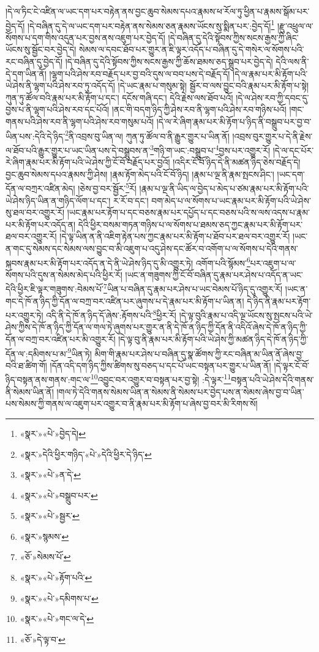 །དེ་ལ་ཏིང་ངེ་འཛིན་ལ་ཡང་དག་པར་བརྟེན་ནས་བྱང་ཆུབ་སེམས་དཔའ་རྣམས་ཕ་རོལ་ཏུ་ཕྱིན་པ་རྣམས་སྒོམ་པར་བྱེད་དོ། །དེ་བཞིན་དུ་དེ་ལ་ཡང་དག་པར་བརྟེན་ནས་སེམས་ཅན་རྣམས་ཡོངས་སུ་སྨིན་པར་:བྱེད་དོ།\footnote{«སྣར་»«པེ་»བྱེད་དེ།} །རྫུ་འཕྲུལ་ལ་སོགས་པ་དག་གིས་འདུན་པར་བྱས་ནས་འཇུག་པར་བྱེད་དོ། །དེ་བཞིན་དུ་དེའི་སྟོབས་ཀྱིས་སངས་རྒྱས་ཀྱི་ཞིང་ཡོངས་སུ་སྦྱོང་བར་བྱེད་དེ། སེམས་ལ་དབང་ཐོབ་པར་གྱུར་ན་ཇི་ལྟར་འདོད་པ་བཞིན་དུ་དེ་གསེར་ལ་སོགས་པའི་རང་བཞིན་དུ་བྱེད་དོ། །དེ་བཞིན་དུ་དེའི་སྟོབས་ཀྱིས་སངས་རྒྱས་ཀྱི་ཆོས་ཐམས་ཅད་སྒྲུབ་པར་བྱེད་དེ། དེའི་ལས་ནི་དེ་དག་ཡིན་ནོ། །ལྷག་པའི་ཤེས་རབ་བརྗོད་པར་བྱ་བའི་དུས་ལ་བབ་པས་དེ་བརྗོད་དོ། །དེ་ལ་རྣམ་པར་མི་རྟོག་པའི་ཡེ་ཤེས་ནི་ལྷག་པའི་ཤེས་རབ་ཏུ་འདོད་དོ། །དེ་ཡང་རྣམ་པ་གསུམ་སྟེ། སྦྱོར་བ་ལས་བྱུང་བའི་རྣམ་པར་མི་རྟོག་པ་སྟེ། ཀུན་ཏུ་ཚོལ་བའི་རྣམ་པར་མི་རྟོག་པ་དང་། དངོས་གཞི་དང་། དེའི་རྗེས་ལས་ཐོབ་པའོ། །དེ་ལ་ཤེས་རབ་ཀྱི་དབང་དུ་བྱས་པ་ནི་ལྷག་པའི་ཤེས་རབ་དང་པོའོ། །ནང་གི་བདག་ཉིད་ཀྱི་ཤེས་རབ་ནི་ལྷག་པའི་ཤེས་རབ་གཉིས་པའོ། །གང་གནས་པའི་ཤེས་རབ་ནི་ལྷག་པའི་ཤེས་རབ་གསུམ་པའོ། །དེ་ལ་རེ་ཞིག་རྣམ་པར་མི་རྟོག་པ་ཉིད་ནི་བསྒྲུབ་པར་བྱ་བ་ཡིན་པས་:དེའི་དེ་ཉིད་\footnote{«སྣར་»དེའི་ཕྱིར་གཉིད་«པེ་»དེའི་ཕྱིར་དེ་ཉིད་}ནི་འབྲས་བུ་ཡིན་ལ། ཀུན་ཏུ་ཚོལ་བ་ནི་རྒྱུར་གྱུར་པ་ཡིན་ནོ། །འབྲས་བུར་གྱུར་པ་དེ་ནི་རྗེས་ལ་ཐོབ་པའི་རྒྱུར་གྱུར་པ་ཡང་ཡིན་པས་དེ་བསྒྲུབས་ན་\footnote{«སྣར་»«པེ་»ན་དེ་}གཉི་ག་ཡང་:བསྒྲུབ་པ་\footnote{«སྣར་»«པེ་»བསྒྲུབ་པར་}བྱས་པར་འགྱུར་རོ། །དེ་ལ་དང་པོར་རེ་ཞིག་རྣམ་པར་མི་རྟོག་པའི་ཡེ་ཤེས་ཀྱི་ངོ་བོ་བརྗོད་པར་བྱའོ། །འདིར་ངོ་བོ་ཉིད་དེ་ནི་མཚན་ཉིད་ཅེས་བརྗོད་དེ། བྱང་ཆུབ་སེམས་དཔའ་རྣམས་ཀྱི་ཤེས། །རྣམ་རྟོག་མེད་པའི་ངོ་བོ་ཉིད། །རྣམ་པ་ལྔ་ནི་རྣམ་སྤངས་ཤིང་། །ཡང་དག་དོན་ལ་བཀྲར་འཛིན་མེད། །ཅེས་བྱ་བར་སྦྱོར་\footnote{«སྣར་»«པེ་»སྦྱར་}རོ། །རྣམ་པ་ལྔ་ནི་ཡིད་ལ་བྱེད་པ་མེད་པ་ཙམ་རྣམ་པར་མི་རྟོག་པའི་ཡེ་ཤེས་ཉིད་ཡིན་ན་གཉིད་ལོག་པ་དང་། ར་རོ་བ་དང་། བག་མེད་པ་ལ་སོགས་པ་ཡང་རྣམ་པར་མི་རྟོག་པའི་ཡེ་ཤེས་སུ་ཐལ་བར་འགྱུར་རོ། །ཡང་རྣམ་པར་རྟོག་པ་དང་བཅས་རྣམ་པར་དཔྱོད་པ་དང་བཅས་པའི་ས་ལས་འདས་པ་རྣམ་པར་མི་རྟོག་པར་འདོད་ན། དེའི་ཕྱིར་བསམ་གཏན་གཉིས་པ་ལ་སོགས་པ་ཐམས་ཅད་ཀྱང་རྣམ་པར་མི་རྟོག་པར་ཐལ་བར་འགྱུར་རོ། །དེ་ལྟ་ཡིན་ན་ནི་འཇིག་རྟེན་པས་ཀྱང་རྣམ་པར་མི་རྟོག་པ་ཐོབ་པར་ཐལ་བར་འགྱུར་རོ། །ཡང་ན་གང་དུ་སེམས་དང་སེམས་ལས་བྱུང་བ་མི་འཇུག་པ་འདུ་ཤེས་དང་ཚོར་བ་འགོག་པ་ལ་སོགས་པ་དེའི་གནས་སྐབས་རྣམ་པར་མི་རྟོག་པར་འདོད་ན་དེ་ནི་ཡེ་ཤེས་ཉིད་དུ་མི་འགྱུར་ཏེ། འགོག་པའི་སྙོམས་\footnote{«སྣར་»སྙམས་}པར་འཇུག་པ་ལ་སོགས་པའི་དུས་ན་སེམས་མེད་པའི་ཕྱིར་རོ། །ཡང་ན་གཟུགས་ཀྱི་ངོ་བོ་བཞིན་དུ་རྣམ་པར་ཤེས་པ་འདོད་ན་ཡང་དེའི་ཕྱིར་ཇི་ལྟར་གཟུགས་:བེམས་པོ་\footnote{«ཅོ་»སེམས་པོ་}ཡིན་པ་བཞིན་དུ་རྣམ་པར་ཤེས་པ་ཡང་བེམས་པོ་ཉིད་དུ་འགྱུར་རོ། །ཡང་ན་གང་དེ་ཁོ་ན་ཉིད་ཀྱི་དོན་ལ་བཀྲ་བར་འཛིན་པར་ཞུགས་པ་དེ་རྣམ་པར་མི་རྟོག་པ་ཡིན་ན། དེ་ཉིད་ནི་རྣམ་པར་རྟོག་པར་འགྱུར་ཏེ། འདི་ནི་དེ་ཁོ་ན་ཉིད་དོ་ཞེས་:རྟོགས་པའི་\footnote{«སྣར་»«པེ་»རྟོག་པའི་}ཕྱིར་རོ། །དེ་ལྟ་བུའི་རྣམ་པ་འདི་ལྔ་ཡོངས་སུ་སྤངས་པའི་ཡེ་ཤེས་ཀྱིས་དེ་ཁོ་ན་ཉིད་ཀྱི་དོན་ལ་གལ་ཏེ་ཞུགས་པར་གྱུར་ན་ནི་དེ་ཁོ་ན་ཉིད་ཀྱི་དོན་ནི་འདིའོ་ཞེས་དེ་ཁོ་ན་ཉིད་ཀྱི་དོན་ལ་བཀྲ་བར་འཛིན་པར་མི་འགྱུར་རོ། །དེ་ལྟ་བུ་ནི་རྣམ་པར་མི་རྟོག་པའི་ཡེ་ཤེས་ཀྱི་མཚན་ཉིད་དེ་ཁོ་ན་ཉིད་ཀྱི་དོན་ལ་:དམིགས་པ་མ་\footnote{«སྣར་»«པེ་»དམིགས་པ་}ཡིན་ཏེ། མིག་གི་རྣམ་པར་ཤེས་པ་བཞིན་དུ་སྣ་ཚོགས་ཀྱི་རང་བཞིན་མ་ཡིན་ནོ་ཞེས་བྱ་བའི་ཐ་ཚིག་གོ། །དོན་འདི་དག་ཉིད་ཀྱིས་ཚིགས་སུ་བཅད་པ་དང་པོ་ཡང་བསྟན་པར་གྱུར་པ་ཡིན་ནོ། །དེ་ལྟར་ངོ་བོ་ཉིད་བསྟན་ནས་གནས་:གང་ལ་\footnote{«སྣར་»«པེ་»གང་ལ་དེ་}འབྱུང་བར་འགྱུར་བ་བསྟན་པར་བྱ་སྟེ། :དེ་ལྟར་\footnote{«ཅོ་»དེ་ལྟ་བ་}བསྟན་པའི་ཡེ་ཤེས་དེའི་གནས་ནི་སེམས་ཡིན་ནོ། །གལ་ཏེ་དེའི་གནས་སེམས་ཡིན་ན་སེམས་ནི་སེམས་པར་བྱེད་པས་ན་སེམས་ཞེས་བྱ་བ་ཡིན་པས་སེམས་ཀྱི་གནས་ལ་འཇུག་པར་འགྱུར་བ་ནི་རྣམ་པར་མི་རྟོག་པ་ཞེས་བྱ་བར་མི་རིགས་སོ། 